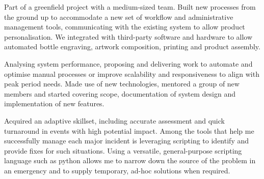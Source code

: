 \cventrycont
    {\begin{cvitems}
        \item{Part of a greenfield project with a medium-sized team. Built new processes from the ground up 
        to accommodate a new set of workflow and administrative management tools, communicating with the existing 
        system to allow product personalisation. We integrated with third-party software and hardware to allow 
        automated bottle engraving, artwork composition, printing and product assembly.}
        \item{Analysing system performance, proposing and delivering work to automate and optimise manual
         processes or improve scalability and responsiveness to align with peak period needs. Made use of 
         new technologies, mentored a group of new members and started covering scope, documentation of system 
         design and implementation of new features.}
         \item{Acquired an adaptive skillset, including accurate assessment and quick turnaround in events with 
         high potential impact. Among the tools that help me successfully manage each major incident is leveraging 
         scripting to identify and provide fixes for such situations. Using a versatile, general-purpose scripting 
         language such as python allows me to narrow down the source of the problem in an emergency and to supply 
         temporary, ad-hoc solutions when required.}
    \end{cvitems}}